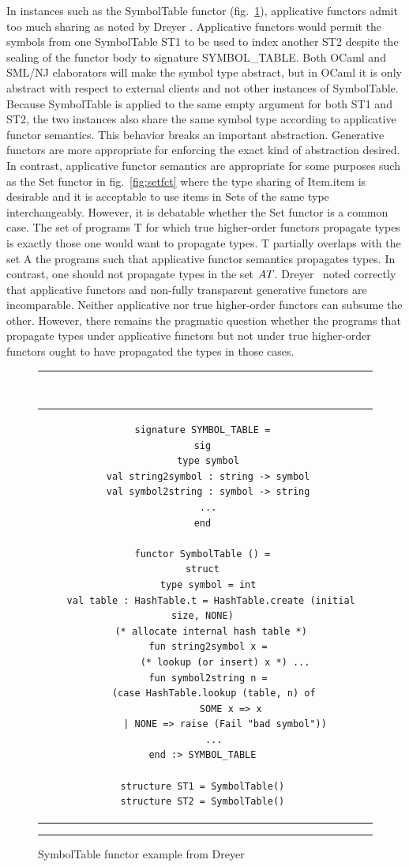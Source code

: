 In instances such as the SymbolTable functor (fig.~\ref{fig:symtbl}), applicative functors admit too much sharing as noted by Dreyer \cite{dreyerthesis}. Applicative functors would permit the symbols from one SymbolTable ST1 to be used to index another ST2 despite the sealing of the functor body to signature SYMBOL\_TABLE. Both OCaml and SML/NJ elaborators will make the symbol type abstract, but in OCaml it is only abstract with respect to external clients and not other instances of SymbolTable. Because SymbolTable is applied to the same empty argument for both ST1 and ST2, the two instances also share the same symbol type according to applicative functor semantics. This behavior breaks an important abstraction. Generative functors are more appropriate for enforcing the exact kind of abstraction desired. In contrast, applicative functor semantics are appropriate for some purposes such as the Set functor in fig.~\ref{fig:setfct} where the type sharing of Item.item is desirable and it is acceptable to use items in Sets of the same type interchangeably. However, it is debatable whether the Set functor is a common case. The set of programs T for which true higher-order functors propagate types is exactly those one would want to propagate types. T partially overlaps with the set A the programs such that applicative functor semantics propagates types. In contrast, one should not propagate types in the set $A\\T$. Dreyer~\cite{dreyerthesis} noted correctly that applicative functors and non-fully transparent generative functors are incomparable. Neither applicative nor true higher-order functors can subsume the other. However, there remains the pragmatic question whether the programs that propagate types under applicative functors but not under true higher-order functors ought to have propagated the types in those cases. 

\begin{figure}
\hrule
~
\begin{center}
\begin{tabular}{c}
\begin{lstlisting}
signature SYMBOL_TABLE = 
sig 
  type symbol 
  val string2symbol : string -> symbol 
  val symbol2string : symbol -> string 
  ... 
end 

functor SymbolTable () = 
struct 
  type symbol = int 
  val table : HashTable.t = HashTable.create (initial size, NONE) 
		(* allocate internal hash table *)		
  fun string2symbol x = 
		(* lookup (or insert) x *) ... 
  fun symbol2string n = 
	(case HashTable.lookup (table, n) of 
		  SOME x => x 
		| NONE => raise (Fail "bad symbol")) 
    ... 
end :> SYMBOL_TABLE 

structure ST1 = SymbolTable() 
structure ST2 = SymbolTable() 
\end{lstlisting}
\end{tabular}
\end{center}
\hrule
\caption{SymbolTable functor example from Dreyer~\cite{dreyerthesis}}
\label{fig:symtbl}	
\end{figure}

